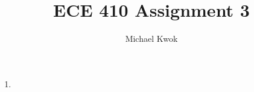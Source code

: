 \documentclass{article}
\title{ECE 410 Assignment 3}
\author{Michael Kwok}
\begin{document}
\maketitle
\begin{enumerate}
  \item

\end{enumerate}
\end{document}
